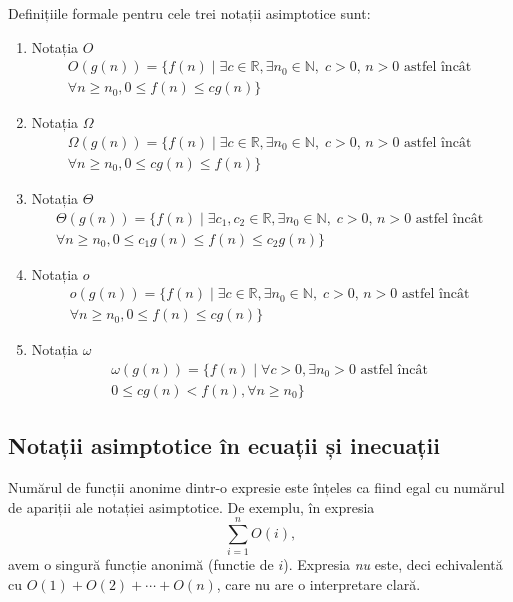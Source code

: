 \documentclass{article}
\begin{document}
Definițiile formale pentru cele trei notații asimptotice sunt:
\begin{enumerate}
	\item Notația $O$
	      \begin{multline}
		      O(g(n)) = \{ f(n) \mid \exists c \in \mathbb{R},
		      \exists n_0 \in \mathbb{N},\; c > 0,\, n > 0 \text{ astfel încât } \\
		      \forall n \geq n_0, 0 \le f(n) \leq c g(n) \}
	      \end{multline}

	\item Notația $\Omega$
	      \begin{multline}
		      \Omega(g(n)) = \{ f(n) \mid \exists c \in \mathbb{R},
		      \exists n_0 \in \mathbb{N},\; c > 0,\, n > 0 \text{ astfel încât } \\
		      \forall n \geq n_0, 0 \le c g(n) \leq f(n) \}
	      \end{multline}

	\item Notația $\Theta$
	      \begin{multline}
		      \Theta(g(n)) = \{ f(n) \mid \exists c_1, c_2 \in \mathbb{R},
		      \exists n_0 \in \mathbb{N},\; c > 0,\, n > 0 \text{ astfel încât } \\
		      \forall n \geq n_0, 0 \le c_1 g(n) \leq f(n) \leq c_2 g(n) \}
	      \end{multline}

	\item Notația $o$
	      \begin{multline}
		      o(g(n)) = \{ f(n) \mid \exists c \in \mathbb{R},
		      \exists n_0 \in \mathbb{N},\; c > 0,\, n > 0 \text{ astfel încât } \\
		      \forall n \geq n_0, 0 \leq f(n) \leq c g(n) \}
	      \end{multline}

	\item Notația $\omega$
	      \begin{multline}
		      \omega(g(n)) = \{ f(n) \mid \forall c > 0,
		      \exists n_0 > 0 \text{ astfel încât } \\
		      0 \leq c g(n) < f(n), \forall n \geq n_0 \}
	      \end{multline}

\end{enumerate}

\subsection{Notații asimptotice în ecuații și inecuații}
Numărul de funcții anonime dintr-o expresie este înțeles ca fiind egal cu
numărul de apariții ale notației asimptotice. De exemplu, în expresia
\begin{equation*}
	\sum_{i = 1}^{n} O(i) \text{,}
\end{equation*}
avem o singură funcție anonimă (functie de $i$). Expresia \emph{nu} este,
deci echivalentă cu $O(1) + O(2) + \cdots + O(n)$, care nu are o interpretare
clară.
\end{document}
